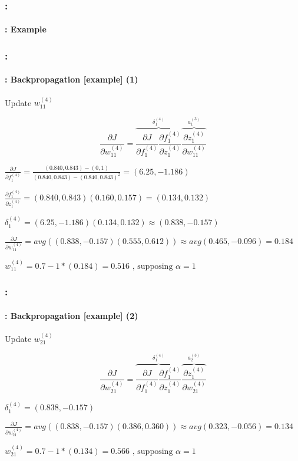 \documentclass[xcolor=table]{beamer}
\begin{document}
\begin{frame}
	\frametitle{\insertshortsubtitle: \insertsection}
	\framesubtitle{\insertsubsection: Example}


\end{frame}

\begin{frame}
	\frametitle{\insertshortsubtitle: \insertsection}
	\framesubtitle{\insertsubsection: Backpropagation [example] (1)}
	
	Update $w_{11}^{(4)}$
	
	\small
	
	\[
	\frac{\partial J}{\partial w_{11}^{(4)}} = \overbrace{\frac{\partial J}{\partial f_{1}^{(4)}} \frac{\partial f_{1}^{(4)}}{\partial z_{1}^{(4)}}}^{\delta_{1}^{(4)}} \overbrace{\frac{\partial z_{1}^{(4)}}{\partial w_{11}^{(4)}}}^{a_{1}^{(3)}}
	\]
	
	$ 
	\frac{\partial J}{\partial f_{1}^{(4)}} = \frac{(0.840, 0.843) - (0, 1)}{(0.840, 0.843) - (0.840, 0.843)^2} 
	= (6.25, -1.186)
	$
	
	$ 
	\frac{\partial f_{1}^{(4)}}{\partial z_{1}^{(4)}} = (0.840, 0.843) (0.160, 0.157) = (0.134, 0.132)
	$
	
	$
	\delta_{1}^{(4)} = (6.25, -1.186) (0.134, 0.132) \approx (0.838, -0.157)
	$
	
	$
	\frac{\partial J}{\partial w_{11}^{(4)}} = avg((0.838, -0.157) (0.555, 0.612)) 
	\approx avg(0.465, -0.096) = 0.184
	$
	
	$
	w_{11}^{(4)} = 0.7 - 1 * (0.184) = 0.516 \text{ , supposing } \alpha = 1
	$

\end{frame}

\begin{frame}
	\frametitle{\insertshortsubtitle: \insertsection}
	\framesubtitle{\insertsubsection: Backpropagation [example] (2)}
	
	Update $w_{21}^{(4)}$
	
	\small
	
	\[
	\frac{\partial J}{\partial w_{21}^{(4)}} = \overbrace{\frac{\partial J}{\partial f_{1}^{(4)}} \frac{\partial f_{1}^{(4)}}{\partial z_{1}^{(4)}}}^{\delta_{1}^{(4)}} \overbrace{\frac{\partial z_{1}^{(4)}}{\partial w_{21}^{(4)}}}^{a_{2}^{(3)}}
	\]
	
	
	$
	\delta_{1}^{(4)} = (0.838, -0.157)
	$
	
	$
	\frac{\partial J}{\partial w_{21}^{(4)}} = avg((0.838, -0.157) (0.386, 0.360)) 
	\approx avg(0.323, -0.056) = 0.134
	$
	
	$
	w_{21}^{(4)} = 0.7 - 1 * (0.134) = 0.566 \text{ , supposing } \alpha = 1
	$

\end{frame}
\end{document}
